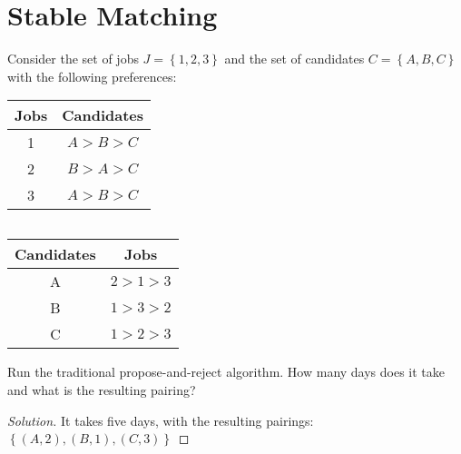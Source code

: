 \documentclass[openany]{book}
\newenvironment{solution}{\begin{proof}[Solution]}{\end{proof}}
\begin{document}
\section{Stable Matching}
\begin{hw}
	Consider the set of jobs $J = \left\{  1,2,3\right\}$ and the set of candidates $C = \left\{  A, B, C\right\}$ with the following preferences:
	
	
	
\begin{tabular}{|c|c|}
	\hline
	Jobs & Candidates \\
	\hline
	1 & $A > B > C$ \\
	\hline
	2 & $B > A > C$ \\
	\hline
	3 & $A > B > C$ \\
	\hline
\end{tabular}
$\qquad$
\begin{tabular}{|c|c|}
	\hline
	Candidates & Jobs \\
	\hline
	A & $2 > 1 > 3$ \\
	\hline
	B & $1 > 3 > 2$ \\
	\hline
	C & $1 > 2> 3$ \\
	\hline
\end{tabular}

Run the traditional propose-and-reject algorithm. How many days does it take and what is the resulting pairing?
\end{hw}
\begin{solution}
	It takes five days, with the resulting pairings: $\left\{  \left( A, 2 \right), \left( B, 1 \right), \left( C,3 \right)\right\}$
\end{solution}
\end{document}
